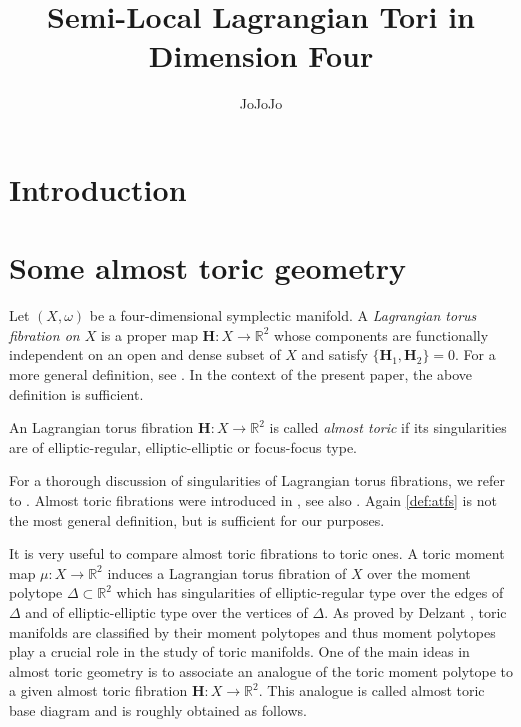 \documentclass[12pt,a4paper,draft]{scrartcl}
\begin{document}
\title{Semi-Local Lagrangian Tori in Dimension Four}
\author{JoJoJo}

\maketitle

\section{Introduction}

\section{Some almost toric geometry}

Let $(X,\omega)$ be a four-dimensional symplectic manifold. A \emph{Lagrangian torus fibration on $X$} is a proper map $\mathbf{H} \colon X \rightarrow \mathbb{R}^2$ whose components are functionally independent on an open and dense subset of $X$ and satisfy $\{\mathbf{H}_1, \mathbf{H}_2\} = 0$. For a more general definition, see \cite[Definition 2.2]{evans2021atfs}. In the context of the present paper, the above definition is sufficient. 

\begin{definition}
    \label{def:atfs}
    An Lagrangian torus fibration $\mathbf{H} \colon X \rightarrow \mathbb{R}^2$ is called \emph{almost toric} if its singularities are of elliptic-regular, elliptic-elliptic or focus-focus type.
\end{definition}

For a thorough discussion of singularities of Lagrangian torus fibrations, we refer to \cite{Zun96,Zun97,Zun03}. Almost toric fibrations were introduced in \cite{symington2002FourDF}, see also \cite{evans2021atfs}. Again \cref{def:atfs} is not the most general definition, but is sufficient for our purposes.

It is very useful to compare almost toric fibrations to toric ones. A toric moment map $\mu \colon X \rightarrow \mathbb{R}^2$ induces a Lagrangian torus fibration of $X$ over the moment polytope $\Delta \subset \mathbb{R}^2$ which has singularities of elliptic-regular type over the edges of $\Delta$ and of elliptic-elliptic type over the vertices of $\Delta$. As proved by Delzant \cite{Del88}, toric manifolds are classified by their moment polytopes and thus moment polytopes play a crucial role in the study of toric manifolds. One of the main ideas in almost toric geometry is to associate an analogue of the toric moment polytope to a given almost toric fibration $\mathbf{H} \colon X \rightarrow \mathbb{R}^2$. This analogue is called almost toric base diagram and is roughly obtained as follows. 
\end{document}
